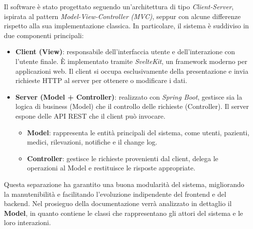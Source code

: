 \documentclass[a4paper]{article}
\begin{document}
Il software è stato progettato seguendo un’architettura di tipo \textit{Client-Server}, 
ispirata al pattern \textit{Model-View-Controller (MVC)}, 
seppur con alcune differenze rispetto alla sua implementazione classica.
 In particolare, il sistema è suddiviso in due componenti principali:

\begin{itemize}
  \item \textbf{Client (View)}: responsabile dell’interfaccia utente e dell’interazione con 
  l’utente finale. È implementato tramite \textit{SvelteKit}, un framework moderno per applicazioni web. 
  Il client si occupa esclusivamente della presentazione e invia richieste HTTP al server per ottenere 
  o modificare i dati.
  \item \textbf{Server (Model + Controller)}: realizzato con \textit{Spring Boot}, gestisce sia 
  la logica di business (Model) che il controllo delle richieste (Controller). Il server espone delle 
  API REST che il client può invocare.
  \begin{itemize}
    \item \textbf{Model}: rappresenta le entità principali del sistema, come utenti, pazienti, medici, 
    rilevazioni, notifiche e il change log.
    \item \textbf{Controller}: gestisce le richieste provenienti dal client, delega 
    le operazioni al Model e restituisce le risposte appropriate.
  \end{itemize}
\end{itemize}
\noindent
Questa separazione ha garantito una buona modularità del sistema, migliorando la manutenibilità e 
facilitando l’evoluzione indipendente del frontend e del backend.
Nel prosieguo della documentazione verrà analizzato in dettaglio il \textbf{Model}, 
in quanto contiene le classi che rappresentano gli attori del sistema e le loro interazioni.
\end{document}
